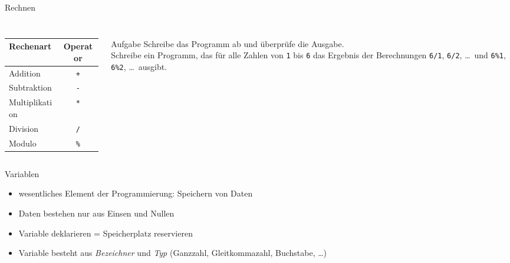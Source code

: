 \documentclass[
  aspectratio=1610,
]{beamer}
\begin{document}
\begin{frame}{Rechnen}
  \inputminted{c}{rechnen.c}

  \begin{columns}[T]
    \begin{column}{0.3\textwidth}
      \begin{tabular}{lc}
        \toprule
        Rechenart & Operator\\
        \midrule
        Addition       & \texttt{+}\\
        Subtraktion    & \texttt{-}\\
        Multiplikation & \texttt{*}\\
        Division       & \texttt{/}\\
        Modulo         & \texttt{\%}\\
        \bottomrule
      \end{tabular}
    \end{column}
    \begin{column}{0.5\textwidth}
      \pause

      \begin{block}{Aufgabe}
        Schreibe das Programm ab und überprüfe die Ausgabe.\\[1ex]

        Schreibe ein Programm, das für alle Zahlen von \texttt{1} bis \texttt{6} das
        Ergebnis der Berechnungen \texttt{6/1}, \texttt{6/2}, \ldots\ und \texttt{6\%1},
        \texttt{6\%2}, \ldots\ ausgibt.
      \end{block}
    \end{column}
  \end{columns}
\end{frame}

\begin{frame}{Variablen}
  \begin{itemize}
    \item wesentliches Element der Programmierung: Speichern von Daten
    \item Daten bestehen nur aus Einsen und Nullen
    \item Variable deklarieren = Speicherplatz reservieren
    \item Variable besteht aus \emph{Bezeichner} und \emph{Typ} (Ganzzahl, Gleitkommazahl,
      Buchstabe, \ldots)
  \end{itemize}
  \pause{}
  \inputminted{c}{variablen1.c}
\end{frame}
\end{document}
